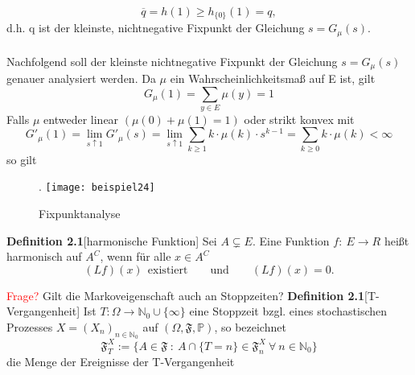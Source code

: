 \begin{equation*}
\overline{q} = h(1) \geq  h_{\lbrace 0 \rbrace}(1) = q,
\end{equation*}
d.h. q ist der kleinste, nichtnegative Fixpunkt der Gleichung $s = G_{\mu}(s)$.
\\
\\
Nachfolgend soll der kleinste nichtnegative Fixpunkt der Gleichung $s = G_{\mu}(s)$ genauer analysiert werden. Da $\mu$ ein Wahrscheinlichkeitsmaß auf E ist, gilt
\begin{equation*}
G_{\mu}(1) = \sum_{y \in E} \mu(y) = 1
\end{equation*}
Falls $\mu$ entweder linear $(\mu(0) + \mu(1) = 1)$  oder strikt konvex mit
\begin{equation*}
G'_{\mu}(1) = \lim_{s \uparrow 1} G'_{\mu}(s) = \lim_{s \uparrow 1} \sum_{ k \geq 1} k \cdot \mu(k) \cdot s^{k-1} = \sum_{ k \geq 0} k \cdot \mu(k) < \infty
\end{equation*}
so gilt
\begin{figure}[H].
\centering
\texttt{[image: beispiel24]}
\caption{Fixpunktanalyse}
\end{figure}
\noindent

\noindent
\textbf{Definition 2.1}[harmonische Funktion]
Sei $A \subsetneq E$. Eine Funktion $f: \: E \to R$ heißt harmonisch auf $A^{C}$, wenn für alle $x \in A^{C}$
\begin{equation*}
(Lf)(x) \: \: \mathrm{existiert} \qquad \mathrm{und} \qquad (Lf)(x) = 0.
\end{equation*}

\noindent
\textcolor{red}{Frage?} Gilt die Markoveigenschaft auch an Stoppzeiten?
\textbf{Definition 2.1}[T-Vergangenheit]
\label{T-Vergangenheit}
Ist $T: \Omega \to \mathbb{N}_{0} \cup \lbrace \infty \rbrace$ eine Stoppzeit bzgl. eines stochastischen Prozesses $X = (X_{n})_{n \in \mathbb{N}_{0}}$ auf $(\Omega, \mathfrak{F}, \mathbb{P})$, so bezeichnet
\begin{equation*}
\mathfrak{F}_{T}^{X} := \lbrace A \in \mathfrak{F} \: : \: A \cap \lbrace T = n \rbrace \in \mathfrak{F}_{n}^{X} \: \forall \: n \in \mathbb{N}_{0} \rbrace
\end{equation*}
die Menge der Ereignisse der T-Vergangenheit

